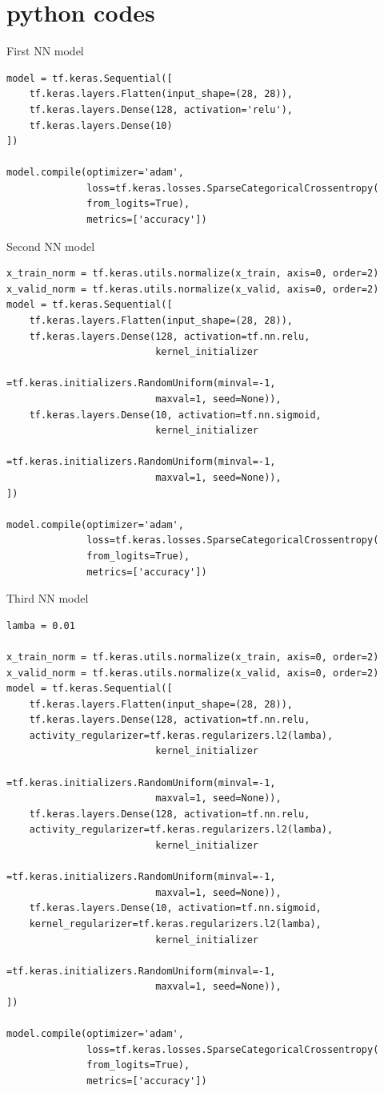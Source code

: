\documentclass[12pt]{article}
\begin{document}
\section{python codes}
First NN model
\begin{verbatim}
model = tf.keras.Sequential([
    tf.keras.layers.Flatten(input_shape=(28, 28)),
    tf.keras.layers.Dense(128, activation='relu'),
    tf.keras.layers.Dense(10)
])

model.compile(optimizer='adam',
              loss=tf.keras.losses.SparseCategoricalCrossentropy(
              from_logits=True),
              metrics=['accuracy'])
\end{verbatim}
Second NN model
\begin{verbatim}
x_train_norm = tf.keras.utils.normalize(x_train, axis=0, order=2)
x_valid_norm = tf.keras.utils.normalize(x_valid, axis=0, order=2)
model = tf.keras.Sequential([
    tf.keras.layers.Flatten(input_shape=(28, 28)),
    tf.keras.layers.Dense(128, activation=tf.nn.relu, 
                          kernel_initializer
                          =tf.keras.initializers.RandomUniform(minval=-1,
                          maxval=1, seed=None)),
    tf.keras.layers.Dense(10, activation=tf.nn.sigmoid,
                          kernel_initializer
                          =tf.keras.initializers.RandomUniform(minval=-1,
                          maxval=1, seed=None)),
])

model.compile(optimizer='adam',
              loss=tf.keras.losses.SparseCategoricalCrossentropy(
              from_logits=True),
              metrics=['accuracy'])
\end{verbatim}
Third NN model
\begin{verbatim}
lamba = 0.01

x_train_norm = tf.keras.utils.normalize(x_train, axis=0, order=2)
x_valid_norm = tf.keras.utils.normalize(x_valid, axis=0, order=2)
model = tf.keras.Sequential([
    tf.keras.layers.Flatten(input_shape=(28, 28)),
    tf.keras.layers.Dense(128, activation=tf.nn.relu,
    activity_regularizer=tf.keras.regularizers.l2(lamba), 
                          kernel_initializer
                          =tf.keras.initializers.RandomUniform(minval=-1,
                          maxval=1, seed=None)),
    tf.keras.layers.Dense(128, activation=tf.nn.relu,
    activity_regularizer=tf.keras.regularizers.l2(lamba),
                          kernel_initializer
                          =tf.keras.initializers.RandomUniform(minval=-1,
                          maxval=1, seed=None)),
    tf.keras.layers.Dense(10, activation=tf.nn.sigmoid,
    kernel_regularizer=tf.keras.regularizers.l2(lamba),
                          kernel_initializer
                          =tf.keras.initializers.RandomUniform(minval=-1,
                          maxval=1, seed=None)),
])

model.compile(optimizer='adam',
              loss=tf.keras.losses.SparseCategoricalCrossentropy(
              from_logits=True),
              metrics=['accuracy'])
\end{verbatim}
\end{document}
